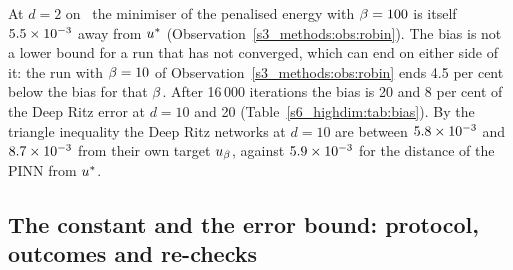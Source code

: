 At $d=2$ on \Pone\ the minimiser of the penalised energy with $\beta=100$ is itself
$5.5\times 10^{-3}$ away from $u^{*}$ (Observation~\ref{s3_methods:obs:robin}). The bias is not a
lower bound for a run that has not converged, which can end on either side of it: the run with
$\beta=10$ of Observation~\ref{s3_methods:obs:robin} ends 4.5 per cent below the bias for that
$\beta$. After 16\,000 iterations the bias is 20 and 8 per cent of the Deep Ritz error at
$d=10$ and 20 (Table~\ref{s6_highdim:tab:bias}). By the triangle inequality the Deep Ritz
networks at $d=10$ are between $5.8\times 10^{-3}$ and $8.7\times 10^{-3}$ from their own target
$u_{\beta}$, against $5.9\times 10^{-3}$ for the distance of the PINN from $u^{*}$.

\subsection{The constant and the error bound: protocol, outcomes and re-checks}\label{S5:sec:bound}

